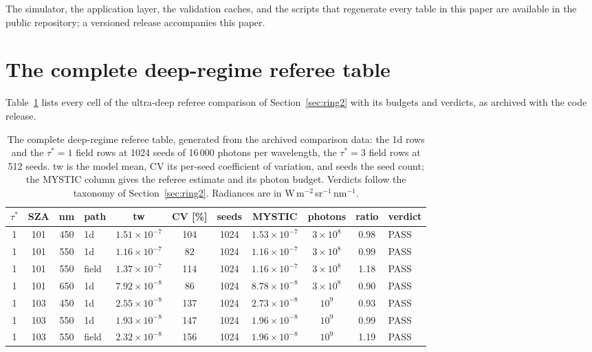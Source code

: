 \documentclass[preprint,12pt]{elsarticle}
\begin{document}
The simulator, the application layer, the validation caches, and the
scripts that regenerate every table in this paper are available in the
public repository; a versioned release accompanies this paper.

\appendix

\section{The complete deep-regime referee table}
\label{app:deep}

Table~\ref{tab:deepfull} lists every cell of the ultra-deep referee
comparison of Section~\ref{sec:ring2} with its budgets and verdicts,
as archived with the code release.

\begin{table}[h]
\centering
\caption{The complete deep-regime referee table, generated from the
archived comparison data: the 1d rows and the $\tau^{*}=1$ field rows
at 1024 seeds of 16\,000 photons per wavelength, the $\tau^{*}=3$
field rows at 512 seeds. tw is the model mean, CV
its per-seed coefficient of variation, and seeds the seed count; the
MYSTIC column gives the referee estimate and its photon budget.
Verdicts follow the taxonomy of Section~\ref{sec:ring2}. Radiances are
in W\,m$^{-2}$\,sr$^{-1}$\,nm$^{-1}$.}
\label{tab:deepfull}
\scriptsize
\setlength{\tabcolsep}{2.5pt}
\begin{tabular}{ccclccccccl}
\toprule
$\tau^{*}$ & SZA & nm & path & tw & CV [\%] & seeds & MYSTIC & photons & ratio & verdict \\
\midrule
1 & 101 & 450 & 1d & $1.51\times10^{-7}$ & 104 & 1024 & $1.53\times10^{-7}$ & $3\times10^{8}$ & 0.98 & PASS \\
1 & 101 & 550 & 1d & $1.16\times10^{-7}$ & 82 & 1024 & $1.16\times10^{-7}$ & $3\times10^{8}$ & 0.99 & PASS \\
1 & 101 & 550 & field & $1.37\times10^{-7}$ & 114 & 1024 & $1.16\times10^{-7}$ & $3\times10^{8}$ & 1.18 & PASS \\
1 & 101 & 650 & 1d & $7.92\times10^{-8}$ & 86 & 1024 & $8.78\times10^{-8}$ & $3\times10^{8}$ & 0.90 & PASS \\
1 & 103 & 450 & 1d & $2.55\times10^{-8}$ & 137 & 1024 & $2.73\times10^{-8}$ & $10^{9}$ & 0.93 & PASS \\
1 & 103 & 550 & 1d & $1.93\times10^{-8}$ & 147 & 1024 & $1.96\times10^{-8}$ & $10^{9}$ & 0.99 & PASS \\
1 & 103 & 550 & field & $2.32\times10^{-8}$ & 156 & 1024 & $1.96\times10^{-8}$ & $10^{9}$ & 1.19 & PASS \\

\end{tabular}
\end{table}
\end{document}
